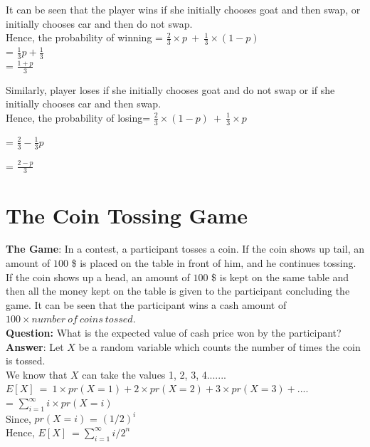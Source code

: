 \documentclass{llncs}
\begin{document}
It can be seen that the player wins if she initially chooses goat and then swap, or initially chooses car and then do not swap.\\

Hence, the probability of winning = $\frac{2}{3} \times p\ +\ \frac{1}{3} \times (1-p)$\\

= $\frac{1}{3}p + \frac{1}{3}$\\

= $\frac{1+p}{3}$

Similarly, player loses if she initially chooses goat and do not swap or if she initially chooses car and then swap. \\

Hence, the probability of losing= $\frac{2}{3} \times (1-p)\ +\ \frac{1}{3} \times p$

= $\frac{2}{3} - \frac{1}{3}p$

= $\frac{2-p}{3}$ 

\section{The Coin Tossing Game}
\textbf{The Game}: In a contest, a participant tosses a coin. If the coin shows up tail, an amount of $100$ \$ is placed on the table in front of him, and he continues tossing. If the coin shows up a head, an amount of $100$ \$ is kept on the same table and then all the money kept on the table is given to the participant concluding the game. It can be seen that the participant wins a cash amount of $100 \times number\ of\ coins\ tossed$. \\

\textbf{Question:} What is the expected value of cash price won by the participant?\\

\textbf{Answer}: 
Let $X$ be a random variable which counts the number of times the coin is tossed.\\

We know that $X$ can take the values 1, 2, 3, 4.......\\
$E[X]\ =\ 1 \times pr(X=1) + 2 \times pr(X=2) + 3 \times pr(X=3)+ .... $\\

= $\sum_{i=1}^{\infty} i \times pr(X=i) $\\

Since, $ pr(X=i) $ = $(1/2)^i$\\

Hence, $E[X]\ = \sum_{i=1}^{\infty} i/2^{n} $\\
\end{document}
